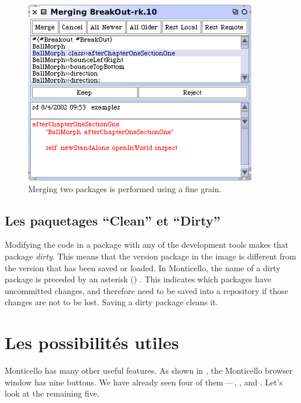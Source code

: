 \documentclass[a4paper,10pt,twoside]{book}
\begin{document}
\begin{figure}[ht]\centering
	\includegraphics[width=.75\linewidth]{merger}
	\caption{Merging two packages is performed using a fine grain.
	}
\end{figure}

\subsection{Les paquetages ``Clean'' et ``Dirty''}

Modifying the code in a package with any of the development tools makes that package \emph{dirty}.
This means that the version package in the image is different from the version that has been saved or loaded. 
In Monticello, the name of a dirty package is preceded by an asterisk (\ct{*}) . This indicates which packages have uncommitted changes, and therefore need to be saved into a repository if those changes are not to be lost. Saving a dirty package cleans it.

\section{Les possibilit\'es utiles} %

Monticello has many other useful features. As shown in , the Monticello browser window has nine buttons. We have already seen four of them\,---\,, ,  and . Let's look at the remaining five.

\end{document}
